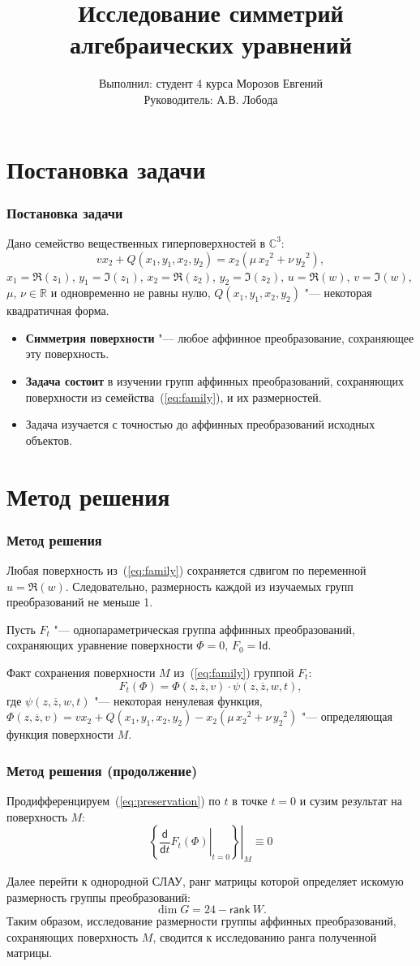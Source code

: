 \documentclass[russian,hyperref={unicode}]{beamer}
\title{Исследование симметрий алгебраических уравнений}
\institute
{
	Воронежский Государственный Университет \\
	Факультет Компьютерных Наук \\
	Кафедра Цифровых Технологий
}
\author
{
	Выполнил: студент 4 курса Морозов Евгений \\
	Руководитель: А.В. Лобода
}
\begin{document}
\frame{\titlepage}

\section{Постановка задачи}
\frame
{
  \frametitle{Постановка задачи}
  Дано семейство вещественных гиперповерхностей в $\mathbb{C}^3$:
  \begin{equation}\label{eq:family}
    v x_2 + Q(x_1, y_1, x_2, y_2) = x_2 (\mu\,{x_2}^2 + \nu\,{y_2}^2),
  \end{equation}
  $x_1 = \Re(z_1)$, $y_1 = \Im(z_1)$, $x_2 = \Re(z_2)$, $y_2 = \Im(z_2)$, $u = \Re(w)$,
  $v = \Im(w)$, $\mu$, $\nu \in \mathbb{R}$ и одновременно не равны нулю, $Q(x_1, y_1,
  x_2, y_2)$ "--- некоторая квадратичная форма.

  \begin{itemize}
	\item \textbf{Симметрия поверхности} "--- любое аффинное преобразование, сохраняющее эту поверхность.
    \item \textbf{Задача состоит} в изучении групп аффинных преобразований, сохраняющих поверхности из семейства~(\ref{eq:family}), и их размерностей.
	\item Задача изучается с точностью до аффинных преобразований исходных объектов.
  \end{itemize}
}
\section{Метод решения}
\frame
{
  \frametitle{Метод решения}
  Любая поверхность из~(\ref{eq:family}) сохраняется сдвигом по переменной $u = \Re(w)$. Следовательно, размерность каждой из изучаемых групп преобразований не меньше 1.

  Пусть $F_t$ "--- однопараметрическая группа аффинных преобразований, сохраняющих уравнение поверхности $\Phi = 0$, $F_0 = \mathsf{Id}$.

  Факт сохранения поверхности $M$ из~(\ref{eq:family}) группой $F_t$:
  \begin{equation}\label{eq:preservation}
  	F_t(\Phi) = \Phi(z, \overline{z}, v) \cdot \psi(z, \overline{z}, w, t),
  \end{equation}
  где $\psi(z, \overline{z}, w, t)$ "--- некоторая ненулевая функция, $\Phi(z, \overline{z}, v) = v x_2 + Q(x_1, y_1, x_2, y_2) - x_2 (\mu\,{x_2}^2 + \nu\,{y_2}^2)$ "--- определяющая функция поверхности $M$.
}
\frame
{
  \frametitle{Метод решения (продолжение)}
  Продифференцируем~(\ref{eq:preservation}) по $t$ в точке $t=0$ и сузим результат на поверхность $M$:
  \begin{equation}\label{eq:main_eq}
  	\left.\left\{ \left.\frac{\mathsf d}{\mathsf d t}F_t(\Phi) \right|_{t=0}\right\}\right|_{M} \equiv 0
  \end{equation}

  Далее перейти к однородной СЛАУ, ранг матрицы которой определяет искомую размерность группы преобразований:
  $$
  	\dim G = 24 - \mathsf{rank}\ W.
  $$
  Таким образом, исследование размерности группы аффинных преобразований, сохраняющих поверхность $M$, сводится к исследованию ранга полученной матрицы.
}
\end{document}

